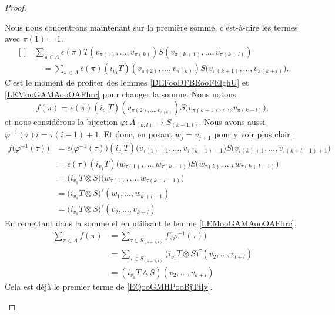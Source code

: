\begin{proof}
\begin{subproof}
		Nous nous concentrons maintenant sur la première somme, c'est-à-dire les termes avec \( \pi(1)=1\).
		\begin{equation}
			\begin{aligned}[]
				 & \sum_{\pi\in A}\epsilon(\pi)T(v_{\pi(1)},\ldots,v_{\pi(k)})S(v_{\pi(k+1)},\ldots,v_{\pi(k+l)})                           \\
				 & \quad=\sum_{\pi\in A}\epsilon(\pi)(i_{v_1}T)(v_{\pi(2)},\ldots,v_{\pi(k)})S\big( v_{\pi(k+1)},\ldots,v_{\pi(k+l)} \big).
			\end{aligned}
		\end{equation}
		C'est le moment de profiter des lemmes \ref{DEFooDFBEooFElghU} et \ref{LEMooGAMAooOAFhrc} pour changer la somme. Nous notons
		\begin{equation}
			f(\pi)=\epsilon(\pi)(i_{v_1}T)(v_{\pi(2),\ldots,v_{\pi(k)}})S\big( v_{\pi(k+1)},\ldots,v_{\pi(k+l)} \big),
		\end{equation}
		et nous considérons la bijection \(\varphi \colon A_{(k,l)}\to S_{(k-1,l)}  \). Nous avons aussi \( \varphi^{-1}(\tau)i=\tau(i-1)+1\). Et donc, en posant \( w_j=v_{j+1}\) pour y voir plus clair :
		\begin{subequations}
			\begin{align}
				f\big( \varphi^{-1}(\tau) \big) & =\epsilon\big( \varphi^{-1}(\tau) \big)(i_{v_1}T)\big( v_{\tau(1)+1},\ldots,v_{\tau(k-1)+1} \big)S\big( v_{\tau(k)+1},\ldots,v_{\tau(k+l-1)+1} \big) \\
				                                & =\epsilon(\tau)(i_{v_1}T)\big( w_{\tau(1)},\ldots,w_{\tau(k-1)} \big)S\big( w_{\tau(k)},\ldots,w_{\tau(k+l-1)} \big)                                 \\
				                                & = \big( i_{v_1}T\otimes S \big)\big( w_{\tau(1)},\ldots,w_{\tau(k+l-1)} \big)                                                                        \\
				                                & = \big( i_{v_1}T\otimes S \big)^{\tau}(w_1,\ldots,w_{k+l-1})                                                                                         \\
				                                & = \big( i_{v_1}T\otimes S \big)^{\tau}(v_2,\ldots,v_{k+l})
			\end{align}
		\end{subequations}
		En remettant dans la somme et en utilisant le lemme \ref{LEMooGAMAooOAFhrc},
		\begin{subequations}		\label{SUBEQSooSDMCooHmPCZr}
			\begin{align}
				\sum_{\pi\in A}f(\pi) & =\sum_{\tau\in S_{(k-1,l)}}f\big( \varphi^{-1}(\tau) \big)                           \\
				                      & =\sum_{\tau \in S_{(k-1,l)}}\big( i_{v_1}T\otimes S \big)^{\tau}(v_2,\ldots,v_{l+l}) \\
				                      & =(i_{v_1}T\wedge S)(v_2,\ldots,v_{k+l})
			\end{align}
		\end{subequations}
		Cela est déjà le premier terme de \eqref{EQooGMHPooBjTtly}.


\end{subproof}
\end{proof}
